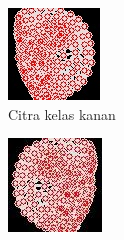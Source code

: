 \begin{figure}[H]
  \centering
  \begin{subfigure}{0.3\textwidth}
      \centering
      \includegraphics[width=\linewidth]{gambar/100 kanan.jpg}
      \caption{Citra kelas kanan}
      \label{fig:image1}
  \end{subfigure}
  \hfill
  \begin{subfigure}{0.3\textwidth}
      \centering
      \includegraphics[width=\linewidth]{gambar/100 kiri.jpg}

\end{subfigure}
\end{figure}

